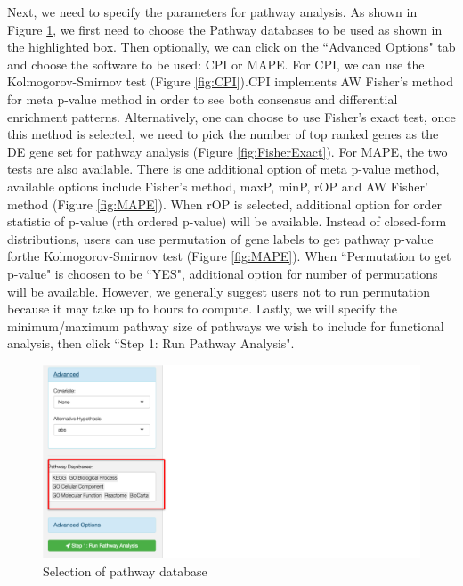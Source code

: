Next, we need to specify the parameters for pathway analysis. As shown in Figure \ref{fig:PathwayDB}, we first need to choose the Pathway databases to be used as shown in the highlighted box. Then optionally, we can click on the ``Advanced Options" tab and choose the software to be used: CPI or MAPE. For CPI, we can use the Kolmogorov-Smirnov test (Figure \ref{fig:CPI}).CPI implements AW Fisher's method for meta p-value method in order to see both consensus and differential enrichment patterns. Alternatively, one can choose to use Fisher's exact test, once this method is selected, we need to pick the number of top ranked genes as the DE gene set for pathway analysis (Figure \ref{fig:FisherExact}). For MAPE, the two tests are also available. There is one additional option of meta p-value method, available options include Fisher's method, maxP, minP, rOP and AW Fisher' method (Figure \ref{fig:MAPE}). When rOP is selected, additional option for order statistic of p-value (rth ordered p-value) will be available. Instead of closed-form distributions, users can use permutation of gene labels to get pathway p-value forthe Kolmogorov-Smirnov test (Figure \ref{fig:MAPE}). When ``Permutation to get p-value" is choosen to be ``YES", additional option for number of permutations will be available. However, we generally suggest users not to run permutation because it may take up to hours to compute. Lastly, we will specify the minimum/maximum pathway size of pathways we wish to include for functional analysis, then click ``Step 1: Run Pathway Analysis".     

\begin{figure}[H]
\begin{center}
\includegraphics[scale=0.45]{./figure/metaPath/PathwayDB}
\caption{Selection of pathway database}
\label{fig:PathwayDB}
\end{center}
\end{figure}

